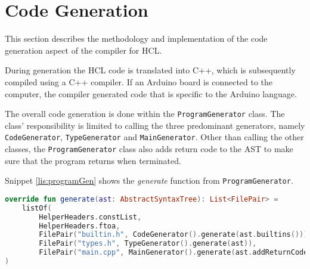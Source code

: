 \section{Code Generation}
This section describes the methodology and implementation of the code generation aspect of the compiler for HCL. 

During generation the HCL code is translated into C++, which is subsequently compiled using a C++ compiler.
If an Arduino board is connected to the computer, the compiler generated code that is specific to the Arduino language. 

The overall code generation is done within the \texttt{ProgramGenerator} class.
The class' responsibility is limited to calling the three predominant generators, namely \texttt{CodeGenerator}, \texttt{TypeGenerator} and \texttt{MainGenerator}.
Other than calling the other classes, the \texttt{ProgramGenerator} class also adds return code to the AST to make sure that the program returns when terminated. 

Snippet \ref{lis:programGen} shows the \textit{generate} function from \texttt{ProgramGenerator}.

\begin{lstlisting}[language=Kotlin,label=lis:programGen,caption=The implementation of \textit{generate} in \texttt{ProgramGenerator}.]
override fun generate(ast: AbstractSyntaxTree): List<FilePair> = 
	listOf(
		HelperHeaders.constList,
		HelperHeaders.ftoa,
		FilePair("builtin.h", CodeGenerator().generate(ast.builtins())),
		FilePair("types.h", TypeGenerator().generate(ast)),
		FilePair("main.cpp", MainGenerator().generate(ast.addReturnCode().notBuiltins()))
)
\end{lstlisting}


